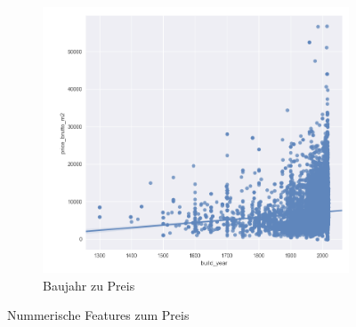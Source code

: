 \begin{figure}[h]
\begin{subfigure}{.5\textwidth}
    \includegraphics[width=\linewidth]{images/anhang/analysis/BYear_zu_preis.png}
    \caption{Baujahr zu Preis} 
  \end{subfigure}
  \caption{Nummerische Features zum Preis}
  \end{figure}


\clearpage
